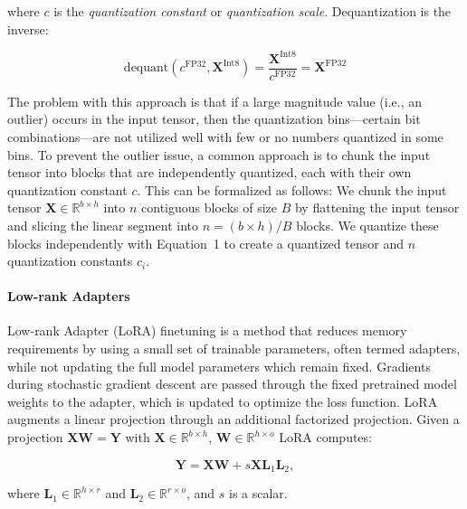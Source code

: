 where $c$ is the {\em quantization constant} or {\em quantization scale}. Dequantization is the inverse:

\begin{equation}
    \text{dequant}(c^{\text{FP32}}, \mathbf{X}^{\text{Int8}}) = \frac{\mathbf{X}^{\text{Int8}}}{c^{\text{FP32}}} = \mathbf{X}^{\text{FP32}}
\end{equation}

The problem with this approach is that if a large magnitude value (i.e., an outlier) occurs in the input tensor, then the quantization bins—certain bit combinations—are not utilized well with few or no numbers quantized in some bins. To prevent the outlier issue, a common approach is to chunk the input tensor into blocks that are independently quantized, each with their own quantization constant $c$. This can be formalized as follows: We chunk the input tensor  $\mathbf{X}\in \mathbb{R}^{b\times h}$ into $n$ contiguous blocks of size $B$ by flattening the input tensor and slicing the linear segment into ${n = ({b\times h} )/{B} }$ blocks. We quantize these blocks independently with Equation~1 to create a quantized tensor and $n$ quantization constants $c_i$.

\paragraph{Low-rank Adapters} Low-rank Adapter (LoRA) finetuning \citep{hu2021lora} is a method that reduces memory requirements by using a small set of trainable parameters, often termed adapters, while not updating the full model parameters which remain fixed. Gradients during stochastic gradient descent are passed through the fixed pretrained model weights to the adapter, which is updated to optimize the loss function. LoRA augments a linear projection through an additional factorized projection. Given a projection ${\mathbf{X} \mathbf{W} = \mathbf{Y}}$ with $\mathbf{X}\in  \mathbb{R}^{b\times h}$, $\mathbf{W}\in  \mathbb{R}^{h\times o}$ LoRA computes:

\begin{equation}
    \mathbf{Y} = \mathbf{X}\mathbf{W} + s\mathbf{X}\mathbf{L}_1\mathbf{L}_2,
\end{equation}

where $\mathbf{L}_1\in  \mathbb{R}^{h\times r}$ and $\mathbf{L}_2\in  \mathbb{R}^{r\times o}$, and $s$ is a scalar.

